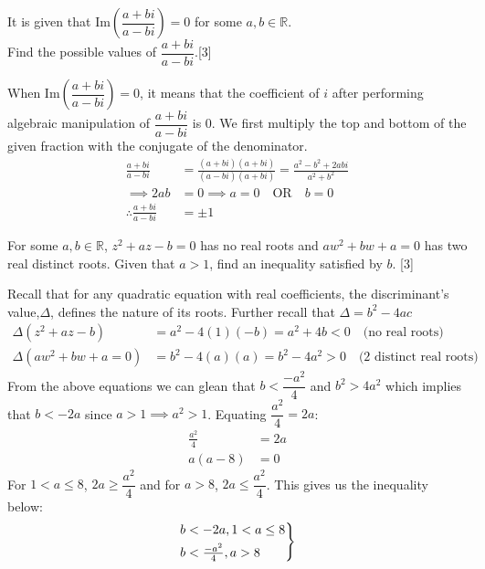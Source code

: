 \documentclass[12pt, a4 paper]{article}
\begin{document}
\begin{outline}[enumerate]
	\2 It is given that $\textrm{Im}(\dfrac{a+bi}{a-bi})=0$ for some $a,b \in \mathbb{R}$. \\ Find the possible values of $\dfrac{a+bi}{a-bi}$.\hfill[3] %
	\begin{answer}
		When $\textrm{Im}(\dfrac{a+bi}{a-bi})=0$, it means that the coefficient of $i$ after performing algebraic manipulation of $\dfrac{a+bi}{a-bi}$ is 0. We first multiply the top and bottom of the given fraction with the conjugate of the denominator.
		\begin{align*}
			\frac{a+bi}{a-bi}            & = \frac{(a+bi)(a+bi)}{(a-bi)(a+bi)} = \frac{a^2-b^2+2abi}{a^2+b^2} \\
			\implies 2ab                 & = 0 \implies a=0 \quad\textrm{OR}\quad b=0                         \\
			\therefore \frac{a+bi}{a-bi} & = \pm1
		\end{align*}
	\end{answer}

	\2 For some $a,b \in \mathbb{R}$, $z^2+az-b=0$ has no real roots and $aw^2+bw+a=0$ has two real distinct roots. Given that $a>1$, find an inequality satisfied by $b$. \hfill[3] %
	\begin{answer}
		Recall that for any quadratic equation with real coefficients, the discriminant's value,$\Delta$, defines the nature of its roots. Further recall that $\Delta = b^2-4ac$
		\begin{align*}
			\Delta(z^2+az-b)    & = a^2-4(1)(-b) = a^2+4b < 0 \quad\textrm{(no real roots)}         \\
			\Delta(aw^2+bw+a=0) & = b^2-4(a)(a) = b^2-4a^2 >0 \quad\textrm{(2 distinct real roots)}
		\end{align*}
		From the above equations we can glean that $b<\dfrac{-a^2}{4}$ and $b^2>4a^2$ which implies that $b<-2a$ since $a>1\implies a^2>1$. Equating $\dfrac{a^2}{4}=2a$:
		\begin{align*}
			\frac{a^2}{4} & =2a \\
			a(a-8)        & = 0
		\end{align*}
		For $1<a\leq8$, $2a\geq\dfrac{a^2}{4}$ and for $a>8$, $2a\leq\dfrac{a^2}{4}$. This gives us the inequality below:
		\begin{align*}
			\begin{rcases}
			b<-2a, 1<a\leq8       \\
			b<\frac{-a^2}{4}, a>8
			\end{rcases}
		\end{align*}
	\end{answer}


\end{outline}
\end{document}
